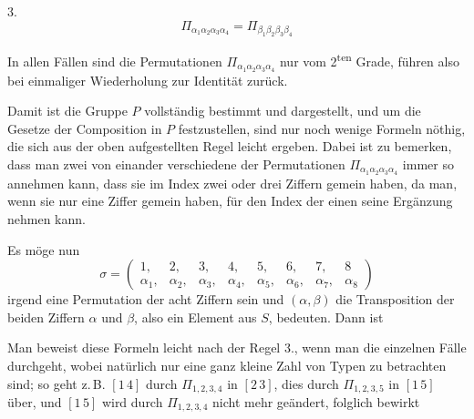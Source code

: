 
3.\ 
\[
\Pi_{\alpha_1\alpha_2\alpha_3\alpha_4} = \Pi_{\beta_1\beta_2\beta_3\beta_4}
\]

In allen Fällen sind die Permutationen $\Pi_{\alpha_1\alpha_2\alpha_3\alpha_4}$ nur vom 2\textsuperscript{ten} Grade, führen also bei einmaliger Wiederholung zur Identität zurück.

Damit ist die Gruppe $P$ vollständig bestimmt und dargestellt, und um die Gesetze der Composition in $P$ festzustellen, sind nur noch wenige Formeln nöthig, die sich aus der oben aufgestellten Regel leicht ergeben. Dabei ist zu bemerken, dass man zwei von einander verschiedene der Permutationen $\Pi_{\alpha_1\alpha_2\alpha_3\alpha_4}$ immer so annehmen kann, dass sie im Index zwei oder drei Ziffern gemein haben, da man, wenn sie nur eine Ziffer gemein haben, für den Index der einen seine Ergänzung nehmen kann.

Es möge nun
\[
\sigma = \begin{pmatrix} 1, & 2, & 3, & 4, & 5, & 6, & 7, & 8 \\ \alpha_1, & \alpha_2, & \alpha_3, & \alpha_4, & \alpha_5, & \alpha_6, & \alpha_7, & \alpha_8 \end{pmatrix}
\]
irgend eine Permutation der acht Ziffern sein und $(\alpha, \beta)$ die Transposition der beiden Ziffern $\alpha$ und $\beta$, also ein Element aus $S$, bedeuten. Dann ist

Man beweist diese Formeln leicht nach der Regel 3., wenn man die einzelnen Fälle durchgeht, wobei natürlich nur eine ganz kleine Zahl von Typen zu betrachten sind; so geht z.\,B. $[1\,4]$ durch $\Pi_{1,2,3,4}$ in $[2\,3]$, dies durch $\Pi_{1,2,3,5}$ in $[1\,5]$ über, und $[1\,5]$ wird durch $\Pi_{1,2,3,4}$ nicht mehr geändert, folglich bewirkt

